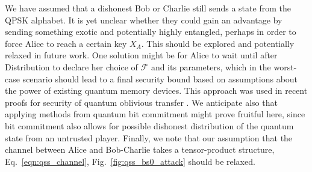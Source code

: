 We have assumed that a dishonest Bob or Charlie still sends a state from the QPSK alphabet. It is yet unclear whether they could gain an advantage by sending something exotic and potentially highly entangled, perhaps in order to force Alice to reach a certain key $X_A$. This should be explored and potentially relaxed in future work. One solution might be for Alice to wait until after Distribution to declare her choice of $\mathcal{F}$ and its parameters, which in the worst-case scenario should lead to a final security bound based on assumptions about the power of existing quantum memory devices. This approach was used in recent proofs for security of quantum oblivious transfer \cite{Furrer2017, Broadbent2015}. We anticipate also that applying methods from quantum bit commitment \cite{Broadbent2015} might prove fruitful here, since bit commitment also allows for possible dishonest distribution of the quantum state from an untrusted player. Finally, we note that our assumption that the channel between Alice and Bob-Charlie takes a tensor-product structure, Eq.~\ref{eqn:qss_channel}, Fig.~\ref{fig:qss_bs0_attack} should be relaxed. %





